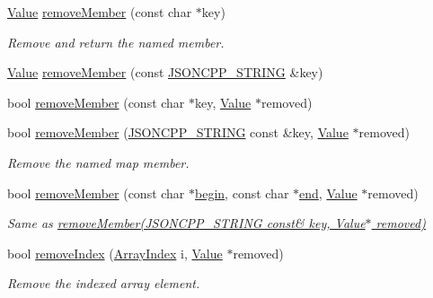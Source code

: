 \begin{DoxyCompactItemize}
\item 
\hyperlink{class_json_1_1_value}{Value} \hyperlink{class_json_1_1_value_aa52f7873b95d29627d6e83ba96f69aaa}{remove\+Member} (const char $\ast$key)
\begin{DoxyCompactList}\small\item\em Remove and return the named member. \end{DoxyCompactList}\item 
\hyperlink{class_json_1_1_value}{Value} \hyperlink{class_json_1_1_value_a1dfd5d30fbc53fcd9c4955b8b3e7885c}{remove\+Member} (const \hyperlink{json_8h_a1e723f95759de062585bc4a8fd3fa4be}{J\+S\+O\+N\+C\+P\+P\+\_\+\+S\+T\+R\+I\+NG} \&key)
\item 
bool \hyperlink{class_json_1_1_value_a708e599489adf30d65bf85a8ee16e6fb}{remove\+Member} (const char $\ast$key, \hyperlink{class_json_1_1_value}{Value} $\ast$removed)
\item 
bool \hyperlink{class_json_1_1_value_ae385ecef98427970df525ee876e9f54a}{remove\+Member} (\hyperlink{json_8h_a1e723f95759de062585bc4a8fd3fa4be}{J\+S\+O\+N\+C\+P\+P\+\_\+\+S\+T\+R\+I\+NG} const \&key, \hyperlink{class_json_1_1_value}{Value} $\ast$removed)
\begin{DoxyCompactList}\small\item\em Remove the named map member. \end{DoxyCompactList}\item 
bool \hyperlink{class_json_1_1_value_a49c91af727d6b4eb0af02a81bb2def87}{remove\+Member} (const char $\ast$\hyperlink{class_json_1_1_value_a015459a3950c198d63a2d3be8f5ae296}{begin}, const char $\ast$\hyperlink{class_json_1_1_value_a3e443cd0ef24f7e028b175e47ee045e0}{end}, \hyperlink{class_json_1_1_value}{Value} $\ast$removed)
\begin{DoxyCompactList}\small\item\em Same as \hyperlink{class_json_1_1_value_ae385ecef98427970df525ee876e9f54a}{remove\+Member(\+J\+S\+O\+N\+C\+P\+P\+\_\+\+S\+T\+R\+I\+N\+G const\& key, Value$\ast$ removed)} \end{DoxyCompactList}\item 
bool \hyperlink{class_json_1_1_value_ae9e67e08a85a2f3be3396ec0f4c47f65}{remove\+Index} (\hyperlink{class_json_1_1_value_a184a91566cccca7b819240f0d5561c7d}{Array\+Index} i, \hyperlink{class_json_1_1_value}{Value} $\ast$removed)
\begin{DoxyCompactList}\small\item\em Remove the indexed array element. \end{DoxyCompactList}\item 

\end{DoxyCompactItemize}
